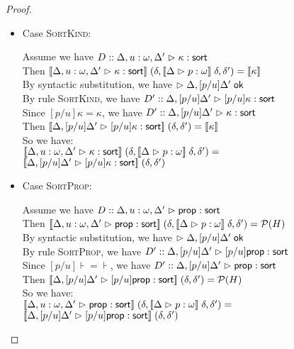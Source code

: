\begin{proof}
\begin{enumerate}
    \begin{itemize}
    \item Case \textsc{SortKind}: 
      \begin{tabbedproof}
        \oo Assume we have $D :: \judgeSort[{\Delta, u:\omega, \Delta'}]{\kappa}$ \\
        \ooo Then $\interp{\judgeSort[{\Delta, u:\omega, \Delta'}]{\kappa}}\;
                     (\delta, \interp{\judgeA{p}{\omega}}\;\delta, \delta') = \interp{\kappa}$ \\
        \ooo By syntactic substitution, we have $\judgeACtx{\Delta, [p/u]\Delta'}$ \\
        \ooo By rule \textsc{SortKind}, we have $D' :: \judgeSort[{\Delta, [p/u]\Delta'}]{[p/u]\kappa}$ \\
        \ooo Since $[p/u]\kappa = \kappa$, we have $D' :: \judgeSort[{\Delta, [p/u]\Delta'}]{\kappa}$ \\
        \ooo Then $\interp{\judgeSort[{\Delta, [p/u]\Delta'}]{[p/u]\kappa}}\;(\delta, \delta') = 
                \interp{\kappa}$ \\
        \ooo So we have: \\
        \ooox $\interp{\judgeSort[{\Delta, u:\omega, \Delta'}]{\kappa}}\;(\delta, \interp{\judgeA{p}{\omega}}\;\delta, \delta') =$ \\
        \ooox $\interp{\judgeSort[{\Delta, [p/u]\Delta'}]{[p/u]\kappa}}\;(\delta, \delta')$ \\
      \end{tabbedproof}

    \item Case \textsc{SortProp}: 
      \begin{tabbedproof}
        \oo Assume we have $D :: \judgeSort[{\Delta, u:\omega, \Delta'}]{\assert}$ \\
        \ooo Then $\interp{\judgeSort[{\Delta, u:\omega, \Delta'}]{\assert}}\;
                     (\delta, \interp{\judgeA{p}{\omega}}\;\delta, \delta') = \powerset{H}$ \\
        \ooo By syntactic substitution, we have $\judgeACtx{\Delta, [p/u]\Delta'}$ \\
        \ooo By rule \textsc{SortProp}, we have $D' :: \judgeSort[{\Delta, [p/u]\Delta'}]{[p/u]\assert}$ \\
        \ooo Since $[p/u]\assert = \assert$, we have $D' :: \judgeSort[{\Delta, [p/u]\Delta'}]{\assert}$ \\
        \ooo Then $\interp{\judgeSort[{\Delta, [p/u]\Delta'}]{[p/u]\assert}}\;(\delta, \delta') = 
                \powerset{H}$ \\
        \ooo So we have: \\
        \ooox $\interp{\judgeSort[{\Delta, u:\omega, \Delta'}]{\assert}}\;(\delta, \interp{\judgeA{p}{\omega}}\;\delta, \delta') =$ \\
        \ooox $\interp{\judgeSort[{\Delta, [p/u]\Delta'}]{[p/u]\assert}}\;(\delta, \delta')$ \\
      \end{tabbedproof}


\end{itemize}
\end{enumerate}
\end{proof}
